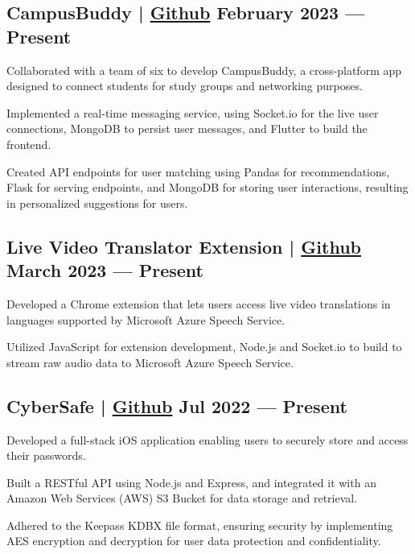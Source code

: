 \subsection{{CampusBuddy | \href{https://github.com/pegliang/CampusBuddy}{Github} \hfill February 2023 --- Present}}
\begin{zitemize}
\item Collaborated with a team of six to develop CampusBuddy, a cross-platform app designed to connect students for study groups and networking purposes.
\item Implemented a real-time messaging service, using Socket.io for the live user connections, MongoDB to persist user messages, and Flutter to build the frontend.
\item Created API endpoints for user matching using Pandas for recommendations, Flask for serving endpoints, and MongoDB for storing user interactions, resulting in personalized suggestions for users.
\end{zitemize}

\subsection{{Live Video Translator Extension | \href{https://github.com/jerikjakobsen/Translator-Extension}{Github} \hfill March 2023 --- Present}}
\begin{zitemize}
\item Developed a Chrome extension that lets users access live video translations in languages supported by Microsoft Azure Speech Service.
\item Utilized JavaScript for extension development, Node.js and Socket.io to build to stream raw audio data to Microsoft Azure Speech Service.
\end{zitemize}

\subsection{{CyberSafe | \href{https://github.com/jerikjakobsen/CyberSafe}{Github} \hfill Jul 2022 --- Present}}
\begin{zitemize}
\item Developed a full-stack iOS application enabling users to securely store and access their passwords.
\item Built a RESTful API using Node.js and Express, and integrated it with an Amazon Web Services (AWS) S3 Bucket for data storage and retrieval.
\item Adhered to the Keepass KDBX file format, ensuring security by implementing AES encryption and decryption for user data protection and confidentiality.
\end{zitemize}
